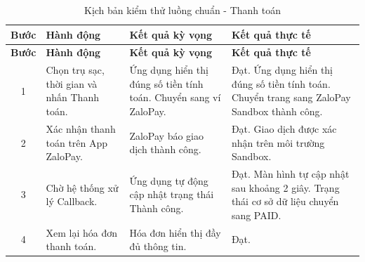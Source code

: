 \begin{center}
    \renewcommand{\arraystretch}{1.5}
    \begin{longtable}{|c|>{\raggedright\arraybackslash}m{}|>{\raggedright\arraybackslash}m{}|>{\raggedright\arraybackslash}m{}|}
        \caption{Kịch bản kiểm thử luồng chuẩn - Thanh toán}
        \label{tab:payment_happy} \\
        \hline
        \textbf{Bước} & \textbf{Hành động} & \textbf{Kết quả kỳ vọng} & \textbf{Kết quả thực tế} \\
        \hline
        \endfirsthead
        
        \hline
        \textbf{Bước} & \textbf{Hành động} & \textbf{Kết quả kỳ vọng} & \textbf{Kết quả thực tế} \\
        \hline
        \endhead
        
        1 & Chọn trụ sạc, thời gian và nhấn Thanh toán. & Ứng dụng hiển thị đúng số tiền tính toán. Chuyển sang ví ZaloPay. & Đạt. Ứng dụng hiển thị đúng số tiền tính toán. Chuyển trang sang ZaloPay Sandbox thành công. \\
        \hline
        2 & Xác nhận thanh toán trên App ZaloPay. & ZaloPay báo giao dịch thành công. & Đạt. Giao dịch được xác nhận trên môi trường Sandbox. \\
        \hline
        3 & Chờ hệ thống xử lý Callback. & Ứng dụng tự động cập nhật trạng thái Thành công. & Đạt. Màn hình tự cập nhật sau khoảng 2 giây. Trạng thái cơ sở dữ liệu chuyển sang PAID. \\
        \hline
        4 & Xem lại hóa đơn thanh toán. & Hóa đơn hiển thị đầy đủ thông tin. & Đạt. \\
        \hline
    \end{longtable}
\end{center}

